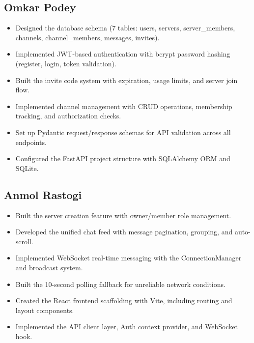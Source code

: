 \documentclass[11pt]{article}
\begin{document}
\subsection{Omkar Podey}
\begin{itemize}[leftmargin=1.5em]
    \item Designed the database schema (7 tables: users, servers, server\_members, channels, channel\_members, messages, invites).
    \item Implemented JWT-based authentication with bcrypt password hashing (register, login, token validation).
    \item Built the invite code system with expiration, usage limits, and server join flow.
    \item Implemented channel management with CRUD operations, membership tracking, and authorization checks.
    \item Set up Pydantic request/response schemas for API validation across all endpoints.
    \item Configured the FastAPI project structure with SQLAlchemy ORM and SQLite.
\end{itemize}

\subsection{Anmol Rastogi}
\begin{itemize}[leftmargin=1.5em]
    \item Built the server creation feature with owner/member role management.
    \item Developed the unified chat feed with message pagination, grouping, and auto-scroll.
    \item Implemented WebSocket real-time messaging with the ConnectionManager and broadcast system.
    \item Built the 10-second polling fallback for unreliable network conditions.
    \item Created the React frontend scaffolding with Vite, including routing and layout components.
    \item Implemented the API client layer, Auth context provider, and WebSocket hook.
\end{itemize}
\end{document}
